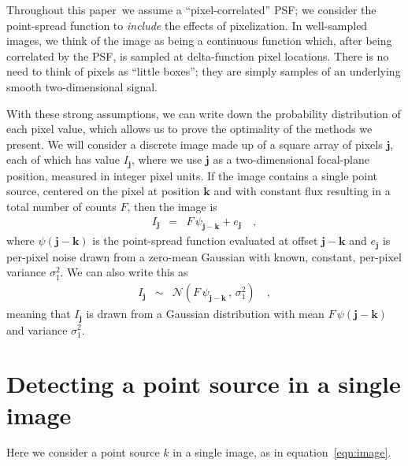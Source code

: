 \documentclass[letterpaper,preprint]{aastex62}
\newcommand{\doctype}{paper}
\newcommand{\equationname}{equation}
\newcommand{\eqnref}[1]{\mbox{\equationname~\ref{#1}}}
\newcommand{\drawnfrom}{\sim}
\newcommand{\gaussianN}{\mathcal{N}}
\newcommand{\gaussx}[2]{\gaussianN\!\left(#1 \, , \, #2\right)}
\newcommand{\psf}{\psi}
\newcommand{\psfat}[1]{\psf_{#1}}
\newcommand{\noise}{e}
\renewcommand{\vec}[1]{\boldsymbol{#1}}
\newcommand{\jvec}{\vec{j}}
\newcommand{\kvec}{\vec{k}}
\begin{document}
Throughout this \doctype\ we assume a ``pixel-correlated'' PSF; we
consider the point-spread function to \emph{include} the effects of
pixelization.  In well-sampled images, we think of the image as being
a continuous function which, after being correlated by the PSF, is
sampled at delta-function pixel locations.  There is no need to think
of pixels as ``little boxes''; they are simply samples of an
underlying smooth two-dimensional signal.



With these strong assumptions, we can write down the probability
distribution of each pixel value, which allows us to prove the
optimality of the methods we present.
%
We will consider a discrete image made up of a square array of pixels
$\jvec$, each of which has value $I_{\jvec}$, where we
use $\jvec$ as a two-dimensional focal-plane position, measured in
integer pixel units.
%
If the image contains a single point source, centered on
the pixel at position $\kvec$ and with constant flux resulting in a
total number of counts $F$, then the image is
\begin{eqnarray}
  I_{\jvec} &=& F \, \psfat{\jvec - \kvec} + \noise_{\jvec} \quad ,
  \label{eqn:image}
\end{eqnarray}
where $\psi(\jvec-\kvec)$ is the point-spread function evaluated at
offset $\jvec-\kvec$ and $\noise_{\jvec}$ is per-pixel noise drawn
from a zero-mean Gaussian with known, constant, per-pixel variance $\sigma_1^2$.
%
We can also write this as
\begin{eqnarray}
  I_{\jvec} &\drawnfrom& \gaussx{F \, \psfat{\jvec - \kvec}}{\sigma_1^2}
  \quad ,
\end{eqnarray}
meaning that $I_{\jvec}$ is drawn from a Gaussian distribution with
mean $F\, \psf(\jvec - \kvec)$ and variance $\sigma_1^2$.


\section{Detecting a point source in a single image}
\label{sec:detection}


Here we consider a point source $k$ in a single image, as in
\eqnref{eqn:image}.
\end{document}
